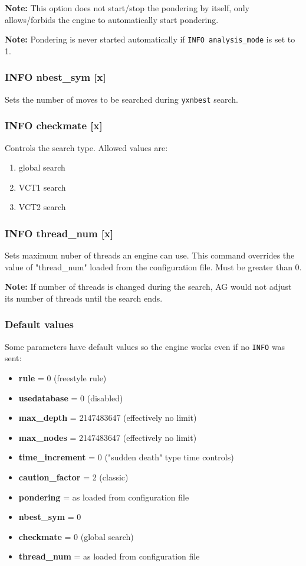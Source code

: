 \documentclass[12pt,a4paper]{article}
\begin{document}
\textbf{Note:} This option does not start/stop the pondering by itself, only allows/forbids the engine to automatically start pondering.

\textbf{Note:} Pondering is never started automatically if \texttt{INFO analysis{\_}mode} is set to 1.

\subsubsection{INFO nbest{\_}sym [x]}
Sets the number of moves to be searched during \texttt{yxnbest} search.

\subsubsection{INFO checkmate [x]}
Controls the search type. Allowed values are:
\begin{enumerate}[leftmargin=7.5em]
	\item[\text{$[x]=0$}]{global search}
	\item[\text{$[x]=1$}]{VCT1 search}
	\item[\text{$[x]=2$}]{VCT2 search}
\end{enumerate}

\subsubsection{INFO thread{\_}num [x]}
Sets maximum nuber of threads an engine can use. This command overrides the value of "thread{\_}num" loaded from the configuration file. Must be greater than 0. 

\textbf{Note:} If number of threads is changed during the search, AG would not adjust its number of threads until the search ends.

\subsubsection{Default values}
Some parameters have default values so the engine works even if no \texttt{INFO} was sent:
\begin{itemize}
\item{\textbf{rule} = 0 (freestyle rule)}
\item{\textbf{usedatabase} = 0 (disabled)}
\item{\textbf{max{\_}depth } = 2147483647 (effectively no limit)}
\item{\textbf{max{\_}nodes} = 2147483647 (effectively no limit)}
\item{\textbf{time{\_}increment} = 0 ("sudden death" \cite{suddendeath} type time controls)}
\item{\textbf{caution{\_}factor} = 2 (classic)}
\item{\textbf{pondering} = as loaded from configuration file}
\item{\textbf{nbest{\_}sym} = 0}
\item{\textbf{checkmate} = 0 (global search)}
\item{\textbf{thread{\_}num} = as loaded from configuration file}
\end{itemize}
\end{document}
